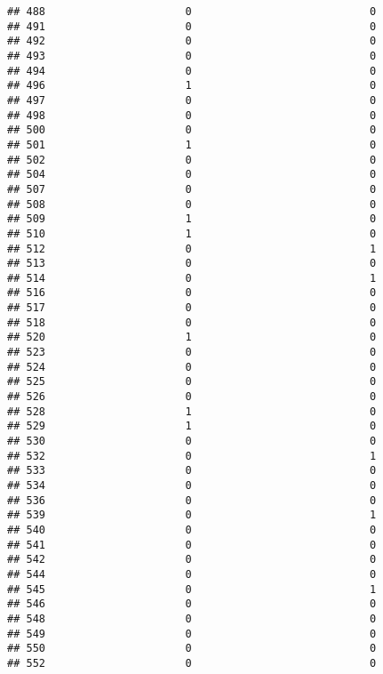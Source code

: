 \documentclass[
]{article}
\begin{document}
\begin{verbatim}
## 488                      0                            0
## 491                      0                            0
## 492                      0                            0
## 493                      0                            0
## 494                      0                            0
## 496                      1                            0
## 497                      0                            0
## 498                      0                            0
## 500                      0                            0
## 501                      1                            0
## 502                      0                            0
## 504                      0                            0
## 507                      0                            0
## 508                      0                            0
## 509                      1                            0
## 510                      1                            0
## 512                      0                            1
## 513                      0                            0
## 514                      0                            1
## 516                      0                            0
## 517                      0                            0
## 518                      0                            0
## 520                      1                            0
## 523                      0                            0
## 524                      0                            0
## 525                      0                            0
## 526                      0                            0
## 528                      1                            0
## 529                      1                            0
## 530                      0                            0
## 532                      0                            1
## 533                      0                            0
## 534                      0                            0
## 536                      0                            0
## 539                      0                            1
## 540                      0                            0
## 541                      0                            0
## 542                      0                            0
## 544                      0                            0
## 545                      0                            1
## 546                      0                            0
## 548                      0                            0
## 549                      0                            0
## 550                      0                            0
## 552                      0                            0

\end{verbatim}
\end{document}
